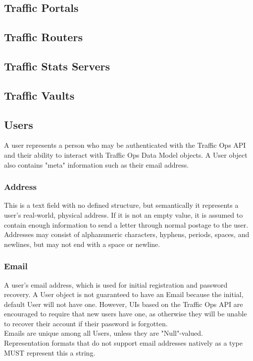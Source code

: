 \subsection{Traffic Portals}



\subsection{Traffic Routers}



\subsection{Traffic Stats Servers}



\subsection{Traffic Vaults}



\subsection{Users\label{sec:users}}
A user represents a person who may be authenticated with the Traffic Ops API and
their ability to interact with Traffic Ops Data Model objects. A User object
also contains "meta" information such as their email address.

\subsubsection{Address}
This is a text field with no defined structure, but semantically it represents a
user's real-world, physical address. If it is not an empty value, it is assumed
to contain enough information to send a letter through normal postage to the
user.\\
Addresses may consist of alphanumeric characters, hyphens, periods, spaces, and
newlines, but may not end with a space or newline.

\subsubsection{Email}
A user's email address, which is used for initial registration and password
recovery. A User object is not guaranteed to have an Email because the initial,
default User will not have one. However, UIs based on the Traffic Ops API are
encouraged to require that new users have one, as otherwise they will be unable
to recover their account if their password is forgotten.\\
Emails are unique among all Users, unless they are "Null"-valued.\\
Representation formats that do not support email addresses natively as a type
MUST represent this a string.

